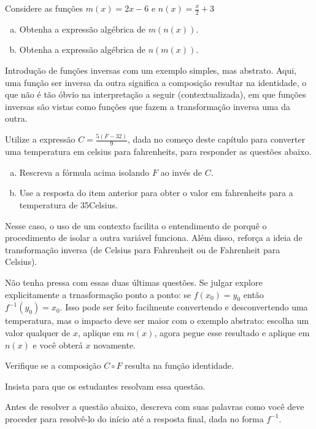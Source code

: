 \documentclass[main_estudante.tex]{subfiles}
\begin{document}
\begin{questao}
Considere as funções $m(x)=2x-6$ e $n(x)=\frac{x}{2}+3$
\begin{enumerate}[a)]
\item Obtenha a expressão algébrica de $m(n(x))$.
\item Obtenha a expressão algébrica de $n(m(x))$.
\end{enumerate}
\end{questao}

Introdução de funções inversas com um exemplo simples, mas abstrato. Aqui, uma função ser inversa da outra significa a composição resultar na identidade, o que não é tão óbvio na interpretação a seguir (contextualizada), em que funções inversas são vistas como funções que fazem a transformação inversa uma da outra.

\begin{questao}
Utilize a expressão $C=\frac{5(F-32)}{9}$, dada no começo deste capítulo para converter uma temperatura em celsius para fahrenheits, para responder as questões abaixo.
\begin{enumerate}[a)]
\item Rescreva a fórmula acima isolando $F$ ao invés de $C$.
\item Use a resposta do item anterior para obter o valor em fahrenheits para a temperatura de 35\degree Celsius.
\end{enumerate}
\end{questao}

Nesse caso, o uso de um contexto facilita o entendimento de porquê o procedimento de isolar a outra variável funciona. Além disso, reforça a ideia de transformação inversa (de Celsius para Fahrenheit ou de Fahrenheit para Celsius).

Não tenha pressa com essas duas últimas questões. Se julgar explore explicitamente a trnasformação ponto a ponto: se $f(x_0)=y_0$ então $f^{-1}(y_0)=x_0$. Isso pode ser feito facilmente convertendo e desconvertendo uma temperatura, mas o impacto deve ser maior com o exemplo abstrato: escolha um valor qualquer de $x$, aplique em $m(x)$, agora pegue esse resultado e aplique em $n(x)$ e você obterá $x$ novamente.

\begin{questao}
Verifique se a composição $C \circ F$ resulta na função identidade.
\end{questao}

Insista para que os estudantes resolvam essa questão.

\begin{reflita}
Antes de resolver a questão abaixo, descreva com suas palavras como você deve proceder para resolvê-lo do início até a resposta final, dada no forma $f^{-1}$. 
\end{reflita}
\end{document}
